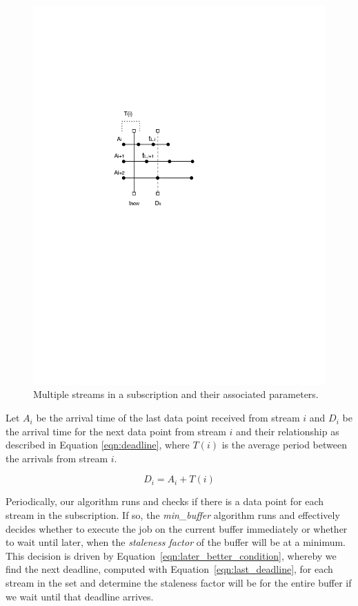 \begin{figure}[t!] %
\centering
\includegraphics[width=0.75\columnwidth]{figs/min_buffer}
\caption{Multiple streams in a subscription and their associated parameters.}
\label{fig:min_buffer}
\end{figure}

Let $A_{i}$ be the arrival time of the last data point received from stream $i$ and $D_{i}$ be the arrival time for the next data point from stream $i$
and their relationship as described in Equation \ref{eqn:deadline}, where $T(i)$ is the average period between the arrivals from stream $i$.

\begin{equation}
D_{i} = A_{i} + T(i)
\label{eqn:deadline}
\end{equation}


Periodically, our algorithm runs and checks if there is a data point for each stream in the subscription.  If so, the \emph{min\_buffer} algorithm runs 
and effectively decides whether to execute the job on the current buffer immediately or whether to wait until later, when the \emph{staleness factor} of
the buffer will be at a minimum.  This decision is driven by Equation~\ref{eqn:later_better_condition}, whereby we find the next deadline, computed with
Equation~\ref{eqn:last_deadline}, for each stream in the set and determine the staleness factor will be for the entire buffer if we wait until that deadline arrives.

